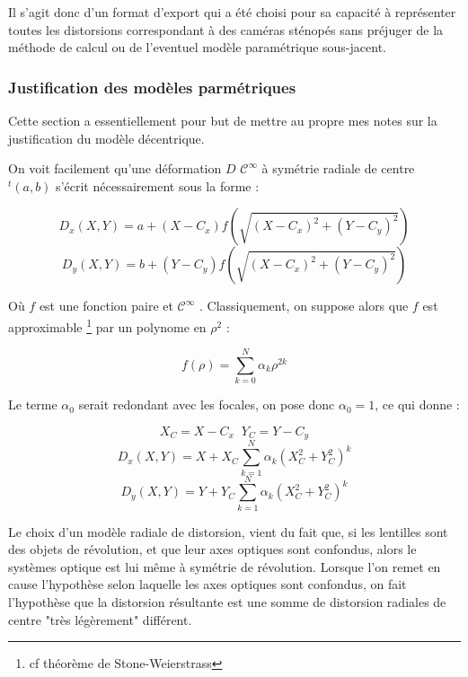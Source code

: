 Il s'agit donc d'un format d'export qui a \'et\'e choisi
pour sa capacit\'e \`a repr\'esenter toutes les distorsions correspondant
\`a des cam\'eras st\'enop\'es sans pr\'ejuger de la m\'ethode
de calcul ou de l'eventuel mod\`ele param\'etrique sous-jacent.



\subsubsection{Justification des mod\`eles parm\'etriques}

\label{Just:Model:Decentr}


Cette section a essentiellement pour but de mettre au propre mes notes
sur la justification du mod\`ele d\'ecentrique.

On voit facilement qu'une d\'eformation $D$ $\mathcal{C}^\infty$ \`a sym\'etrie radiale
de centre $^t(a,b)$ s'\'ecrit n\'ecessairement sous la forme  :

\begin{equation}
   D_x(X,Y) = a + (X-C_x) f(\sqrt{(X-C_x)^2+(Y-C_y)^2})
\end{equation}
\begin{equation}
   D_y(X,Y) = b + (Y-C_y) f(\sqrt{(X-C_x)^2+(Y-C_y)^2})
\end{equation}

O\`u $f$ est une fonction paire et $\mathcal{C}^\infty$ . Classiquement, on suppose
alors que $f$ est approximable  
\footnote{cf th\'eor\`eme de Stone-Weierstrass} 
par un polynome en $\rho^2$ :

\begin{equation}
   f(\rho) = \sum _{k=0}^N  \alpha_k \rho ^{2k}
\end{equation}

Le terme $\alpha_0$ serait redondant avec les focales, on pose donc $\alpha_0=1$,
ce qui donne :

\begin{equation}
  X_C = X-C_x  \; \; Y_C = Y-C_y
\end{equation}
\begin{equation}
   D_x(X,Y) =  X + X_C \sum _{k=1}^N  \alpha_k (X_C^2+Y_C^2)^k
\end{equation}
\begin{equation}
   D_y(X,Y) =  Y + Y_C \sum _{k=1}^N  \alpha_k (X_C^2+Y_C^2)^k
\end{equation}

Le choix d'un mod\`ele radiale de distorsion, vient du fait que, si les lentilles
sont des objets de r\'evolution, et que leur axes optiques sont confondus, alors le
syst\`emes optique est lui m\^eme \`a sym\'etrie de r\'evolution. Lorsque l'on
remet en cause l'hypoth\`ese selon laquelle les axes optiques sont confondus,
on fait l'hypoth\`ese que la distorsion r\'esultante est une somme de distorsion
radiales de centre "tr\`es l\'eg\`erement" diff\'erent.

